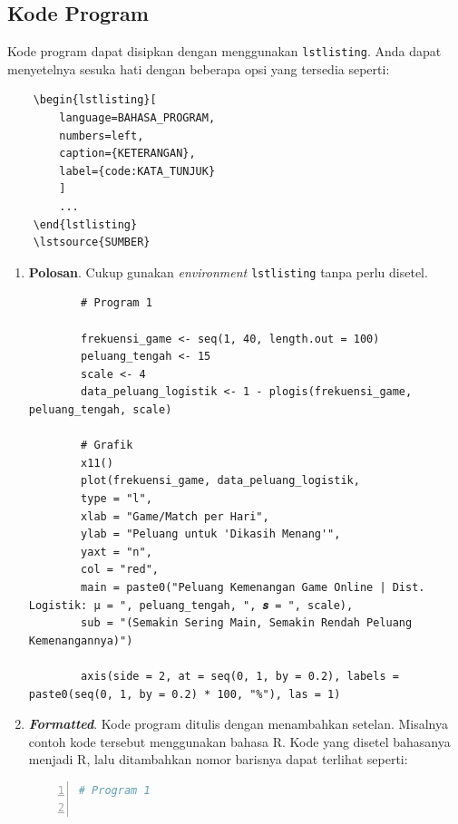 \subsection{Kode Program}

Kode program dapat disipkan dengan menggunakan \texttt{lstlisting}. Anda dapat menyetelnya sesuka hati dengan beberapa opsi yang tersedia seperti:

\begin{verbatim}
    \begin{lstlisting}[
        language=BAHASA_PROGRAM, 
        numbers=left, 
        caption={KETERANGAN}, 
        label={code:KATA_TUNJUK}
        ]
        ...
    \end{lstlisting}
    \lstsource{SUMBER}
\end{verbatim}

\begin{enumerate}[]
    \item \textbf{Polosan}. Cukup gunakan \textit{environment} \texttt{lstlisting} tanpa perlu disetel.
    
    \begin{lstlisting}
        # Program 1
        
        frekuensi_game <- seq(1, 40, length.out = 100)
        peluang_tengah <- 15
        scale <- 4
        data_peluang_logistik <- 1 - plogis(frekuensi_game, peluang_tengah, scale)
        
        # Grafik
        x11()
        plot(frekuensi_game, data_peluang_logistik,
        type = "l",
        xlab = "Game/Match per Hari",
        ylab = "Peluang untuk 'Dikasih Menang'",
        yaxt = "n",
        col = "red",
        main = paste0("Peluang Kemenangan Game Online | Dist. Logistik: μ = ", peluang_tengah, ", 𝒔 = ", scale),
        sub = "(Semakin Sering Main, Semakin Rendah Peluang Kemenangannya)")
        
        axis(side = 2, at = seq(0, 1, by = 0.2), labels = paste0(seq(0, 1, by = 0.2) * 100, "%"), las = 1)
    \end{lstlisting}
    
    \item \textbf{\textit{Formatted}}. Kode program ditulis dengan menambahkan setelan. Misalnya contoh kode tersebut menggunakan bahasa R. Kode yang disetel bahasanya menjadi R, lalu ditambahkan nomor barisnya dapat terlihat seperti:
    
    \begin{lstlisting}[language=R, numbers=left]
        # Program 1
        

\end{lstlisting}
\end{enumerate}
